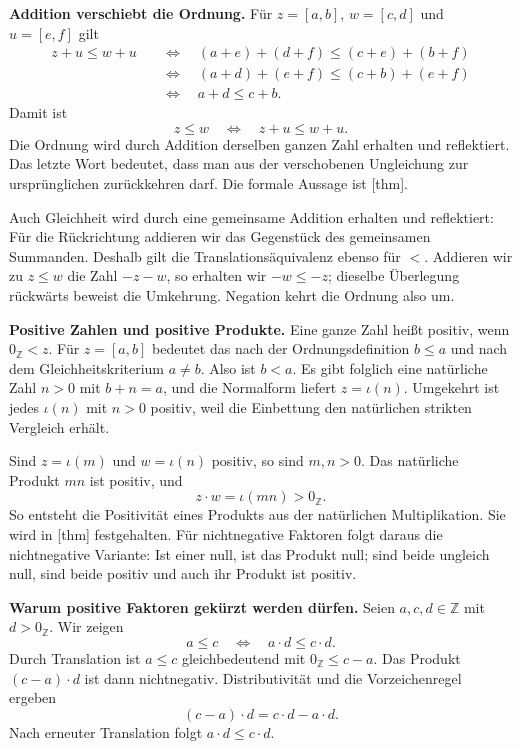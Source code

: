\medskip\noindent\textbf{Addition verschiebt die Ordnung.}
Für \(z=[a,b]\), \(w=[c,d]\) und \(u=[e,f]\) gilt
\[
  \begin{aligned}
    z+u\leq w+u
    &\quad\Longleftrightarrow\quad
       (a+e)+(d+f)\leq(c+e)+(b+f)\\
    &\quad\Longleftrightarrow\quad
       (a+d)+(e+f)\leq(c+b)+(e+f)\\
    &\quad\Longleftrightarrow\quad a+d\leq c+b.
  \end{aligned}
\]
Damit ist
\[
  z\leq w\quad\Longleftrightarrow\quad z+u\leq w+u.
\]
Die Ordnung wird durch Addition derselben ganzen Zahl erhalten und
reflektiert. Das letzte Wort bedeutet, dass man aus der verschobenen
Ungleichung zur ursprünglichen zurückkehren darf. Die formale
Aussage ist [thm].

Auch Gleichheit wird durch eine gemeinsame Addition erhalten und
reflektiert: Für die Rückrichtung addieren wir das Gegenstück des
gemeinsamen Summanden. Deshalb gilt die Translationsäquivalenz
ebenso für \(<\). Addieren wir zu \(z\leq w\) die Zahl
\(-z-w\), so erhalten wir \(-w\leq-z\); dieselbe Überlegung
rückwärts beweist die Umkehrung. Negation kehrt die Ordnung also um.

\medskip\noindent\textbf{Positive Zahlen und positive Produkte.}
Eine ganze Zahl heißt positiv, wenn \(0_{\mathbb Z}<z\).
Für \(z=[a,b]\) bedeutet das nach der Ordnungsdefinition
\(b\leq a\) und nach dem Gleichheitskriterium \(a\ne b\).
Also ist \(b<a\). Es gibt folglich eine natürliche Zahl \(n>0\)
mit \(b+n=a\), und die Normalform liefert \(z=\iota(n)\).
Umgekehrt ist jedes \(\iota(n)\) mit \(n>0\) positiv, weil
die Einbettung den natürlichen strikten Vergleich erhält.

Sind \(z=\iota(m)\) und \(w=\iota(n)\) positiv, so sind
\(m,n>0\). Das natürliche Produkt \(mn\) ist positiv, und
\[
  z\cdot w=\iota(mn)>0_{\mathbb Z}.
\]
So entsteht die Positivität eines Produkts aus der natürlichen
Multiplikation. Sie wird in
[thm] festgehalten.
Für nichtnegative Faktoren folgt daraus die nichtnegative Variante:
Ist einer null, ist das Produkt null; sind beide ungleich null,
sind beide positiv und auch ihr Produkt ist positiv.

\medskip\noindent\textbf{Warum positive Faktoren gekürzt werden dürfen.}
Seien \(a,c,d\in\mathbb Z\) mit \(d>0_{\mathbb Z}\). Wir zeigen
\[
  a\leq c\quad\Longleftrightarrow\quad a\cdot d\leq c\cdot d.
\]
Durch Translation ist \(a\leq c\) gleichbedeutend mit
\(0_{\mathbb Z}\leq c-a\). Das Produkt \((c-a)\cdot d\)
ist dann nichtnegativ. Distributivität und die Vorzeichenregel ergeben
\[
  (c-a)\cdot d=c\cdot d-a\cdot d.
\]
Nach erneuter Translation folgt \(a\cdot d\leq c\cdot d\).

